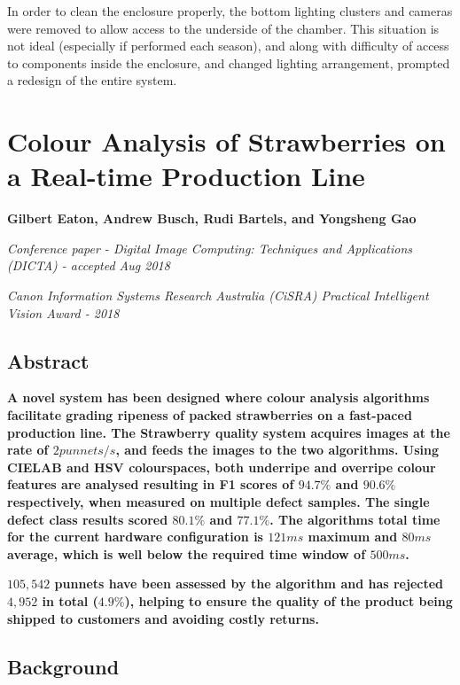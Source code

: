 \documentclass[fleqn,twoside]{article}
\begin{document}
In order to clean the enclosure properly, the bottom lighting clusters and cameras were removed to allow access to the underside of the chamber. This situation is not ideal (especially if performed each season), and along with difficulty of access to components inside the enclosure, and changed lighting arrangement, prompted a redesign of the entire system. 






\newpage
\section{Colour Analysis of Strawberries on a Real-time Production Line}
\label{sec:paper_2}

\textbf{Gilbert Eaton, Andrew Busch, Rudi Bartels, and Yongsheng Gao}

\textit{Conference paper - Digital Image Computing: Techniques and Applications (DICTA) - accepted Aug 2018}

\textit{Canon Information Systems Research Australia (CiSRA) Practical Intelligent Vision Award - 2018}


\subsection{Abstract}

\textbf{A novel system has been designed where colour analysis algorithms facilitate grading ripeness of packed strawberries on a fast-paced production line. The Strawberry quality system acquires images at the rate of $2 punnets/s$, and feeds the images to the two algorithms. Using CIELAB and HSV colourspaces, both underripe and overripe colour features are analysed  resulting in F1 scores of $94.7\%$ and $90.6\%$ respectively, when measured on multiple defect samples. The single defect class results scored $80.1\%$ and $77.1\%$. The algorithms total time for the current hardware configuration is $121ms$ maximum and $80ms$ average, which is well below the required time window of $500ms$.}
	
\textbf{$105,542$ punnets have been assessed by the algorithm and has rejected $4,952$ in total ($4.9\%$),  helping to ensure the quality of the product being shipped to customers and avoiding costly returns.}


\subsection{Background}
\end{document}
